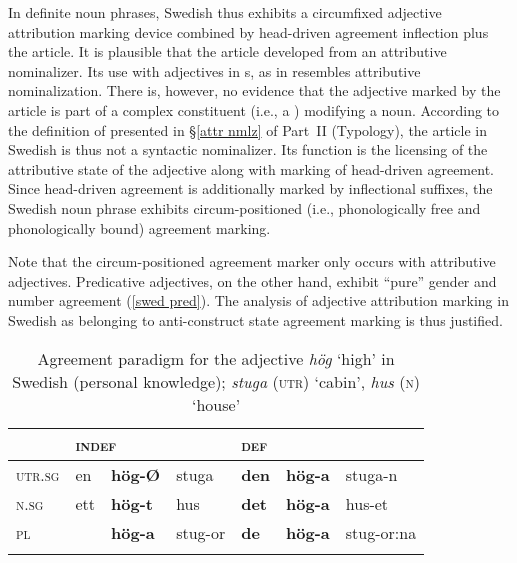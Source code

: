 In definite noun phrases, Swedish thus exhibits a circumfixed adjective attribution marking device combined by head\hyp{}driven agreement inflection plus the article. It is plausible that the article developed from an attributive nominalizer. Its use with adjectives in s, as in  resembles attributive nominalization. There is, however, no evidence that the adjective marked by the article is part of a complex constituent (i.e., a ) modifying a noun. According to the definition of  presented in \S\ref{attr nmlz} of Part~II (Typology), the article in Swedish is thus not a syntactic nominalizer. Its function is the licensing of the attributive state of the adjective along with marking of head\hyp{}driven agreement. Since head\hyp{}driven agreement is additionally marked by inflectional suffixes, the Swedish noun phrase exhibits circum-positioned (i.e., phonologically free and phonologically bound) agreement marking.

Note that the circum-positioned agreement marker only occurs with attributive adjectives. Predicative adjectives, on the other hand, exhibit “pure” gender and number agreement (\ref{swed pred}). The analysis of adjective attribution marking in Swedish as belonging to anti\hyp{}construct state agreement marking is thus justified.
\begin{exe}
\label{swed pred}
\begin{xlist}
\end{xlist}
\end{exe}
\begin{table}
\begin{tabular}{l l l l l l l}
\lsptoprule
			&\multicolumn{3}{l}{\textsc{indef}}	&\multicolumn{3}{l}{\textsc{def}}\\
\midrule
\textsc{utr.sg}	&en	&\textbf{h{ö}g-Ø}&stuga		&\textbf{den}&\textbf{h{ö}g-a}&stuga-n\\

\textsc{n.sg}	&ett	&\textbf{h{ö}g-t}&hus		&\textbf{det}&\textbf{h{ö}g-a}&hus-et\\

\textsc{pl}		&	&\textbf{h{ö}g-a}&stug-or	&\textbf{de}&\textbf{h{ö}g-a}&stug-or:na\\
\lspbottomrule
\end{tabular}
\caption[Adjective paradigm for Swedish]{Agreement paradigm for the adjective \textit{hög} ‘high’ in Swedish (personal knowledge); \textit{stuga} (\textsc{utr}) ‘cabin’, \textit{hus} (\textsc{n}) ‘house’
}
\end{table}

